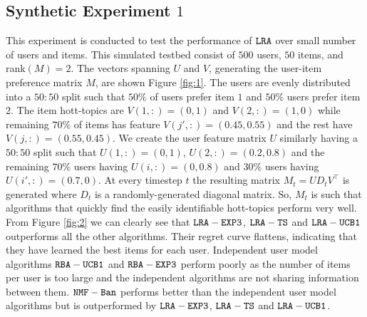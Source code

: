 


\subsection{Synthetic Experiment $1$}
This experiment is conducted to test the performance of ${\tt LRA}$ over small number of users and items. This simulated testbed consist of $500$ users, $50$ items, and rank$(M) = 2$. The vectors spanning $U$ and $V$, generating the user-item preference matrix $M$, are shown Figure \ref{fig:1}. The users are evenly distributed into a $50:50$ split such that $50\%$ of users prefer item $1$ and $50\%$ users prefer item  $2$. The item hott-topics are $V(1,:) = (0,1)$ and $V(2,:) = (1, 0)$ while remaining $70\%$ of items has feature $V(j',:) = (0.45, 0.55)$ and the rest have $V(j,:) = (0.55, 0.45)$. We create the user feature matrix $U$ similarly having a $50:50$ split such that $U(1,:) = (0,1)$, $U(2,:) = (0.2,0.8)$ and the remaining $70\%$ users having $U(i,:) = (0,0.8)$ and $30\%$ users having $U(i',:) = (0.7,0)$. At every timestep $t$ the resulting matrix $M_t =UD_tV^{\intercal}$ is generated where $D_t$ is a randomly-generated diagonal matrix. So, $M_t$ is  such that algorithms that quickly find the easily identifiable hott-topics perform very well. From Figure \ref{fig:2} we can clearly see that ${\tt LRA-EXP3}$, ${\tt LRA-TS}$ and ${\tt LRA-UCB1}$ outperforms all the other algorithms. Their regret curve flattens, indicating that they have learned the best items for each user. Independent user model algorithms ${\tt RBA-UCB1}$ and ${\tt RBA-EXP3}$  perform poorly as the number of items per user is too large and the independent algorithms are not sharing information between them. ${\tt NMF-Ban}$ performs better than the independent user model algorithms but is outperformed by ${\tt LRA-EXP3}$, ${\tt LRA-TS}$ and ${\tt LRA-UCB1}$.

